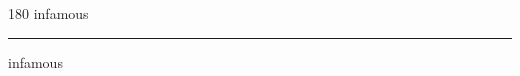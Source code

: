
\begin{frame}
\begin{center}
\begin{turn}{180}
{\fontsize{2.5cm}{1em}\selectfont infamous}
\end{turn}
\vspace{1em}\par  
\hrule
\vspace{1em}\par  
{\fontsize{2.5cm}{1em}\selectfont infamous}
\end{center}
\end{frame}
